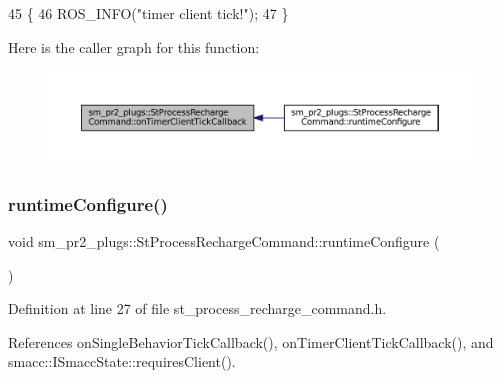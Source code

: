 \begin{DoxyCode}
45     \{
46         ROS\_INFO(\textcolor{stringliteral}{"timer client tick!"});
47     \}
\end{DoxyCode}
Here is the caller graph for this function\+:
\nopagebreak
\begin{figure}[H]
\begin{center}
\leavevmode
\includegraphics[width=350pt]{structsm__pr2__plugs_1_1StProcessRechargeCommand_a71c620cbe618019ad7338c9b88639c68_icgraph}
\end{center}
\end{figure}
\mbox{\label{structsm__pr2__plugs_1_1StProcessRechargeCommand_ae401a2e897f446ddbde833e7686fcd7a}} 
\subsubsection{\texorpdfstring{runtime\+Configure()}{runtimeConfigure()}}
{\footnotesize\ttfamily void sm\+\_\+pr2\+\_\+plugs\+::\+St\+Process\+Recharge\+Command\+::runtime\+Configure (\begin{DoxyParamCaption}{ }\end{DoxyParamCaption})\hspace{0.3cm}{\ttfamily [inline]}}



Definition at line 27 of file st\+\_\+process\+\_\+recharge\+\_\+command.\+h.



References on\+Single\+Behavior\+Tick\+Callback(), on\+Timer\+Client\+Tick\+Callback(), and smacc\+::\+I\+Smacc\+State\+::requires\+Client().


